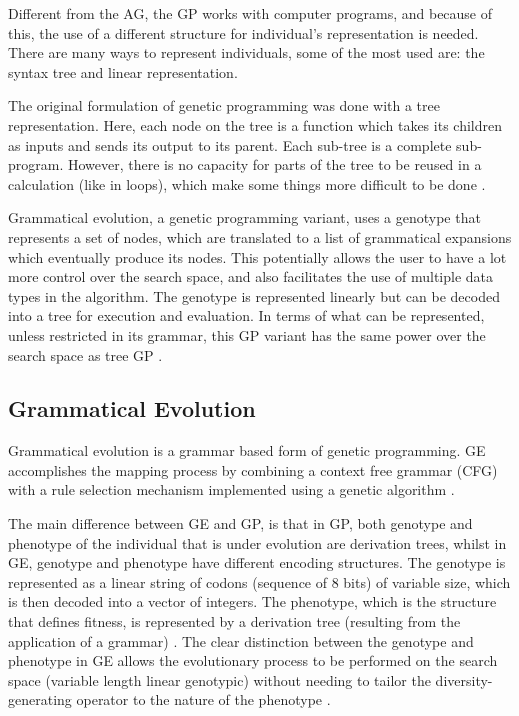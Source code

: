 \documentclass[journal]{IEEEtran}
\begin{document}
	Different from the AG, the GP works with computer programs, and because of this, the use of a different structure for individual's representation is needed. There are many ways to represent individuals, some of the most used are: the syntax tree and linear representation.
	
	The original formulation of genetic programming was done with a tree representation. Here, each node on the tree is a function which takes its children as inputs and sends its output to its parent. Each sub-tree is a complete sub-program. However, there is no capacity for parts of the tree to be reused in a calculation (like in loops), which make some things more difficult to be done \cite{harris2015comparison}. 
	
	Grammatical evolution, a genetic programming variant, uses a genotype that represents a set of nodes, which are translated to a list of grammatical expansions which eventually produce its nodes. This potentially allows the user to have a lot more control over the search space, and also facilitates the use of multiple data types in the algorithm. The genotype is represented linearly but can be decoded into a tree for execution and evaluation. In terms of what can be represented, unless restricted in its grammar, this GP variant has the same power over the search space as tree GP \cite{harris2015comparison}.
	
	\subsection{Grammatical Evolution} \label{subsection:grammaticalEvolution}
	
	Grammatical evolution is a grammar based form of genetic programming. GE accomplishes the mapping process by combining a context free grammar (CFG) with a rule selection mechanism implemented using a genetic algorithm \cite{byrne2015optimising}.
	
	The main difference between GE and GP, is that in GP, both genotype and phenotype of the individual that is under evolution are derivation trees, whilst in GE, genotype and phenotype have different encoding structures. The genotype is represented as a linear string of codons (sequence of 8 bits) of variable size, which is then decoded into a vector of integers. The phenotype, which is the structure that defines fitness, is represented by a derivation tree (resulting from the application of a grammar) \cite{cerri2013grammatical}. The clear distinction between the genotype and phenotype in GE allows the evolutionary process to be performed on the search space (variable length linear genotypic) without needing to tailor the diversity-generating operator to the nature of the phenotype \cite{sabar2013grammatical}.
	
\end{document}
